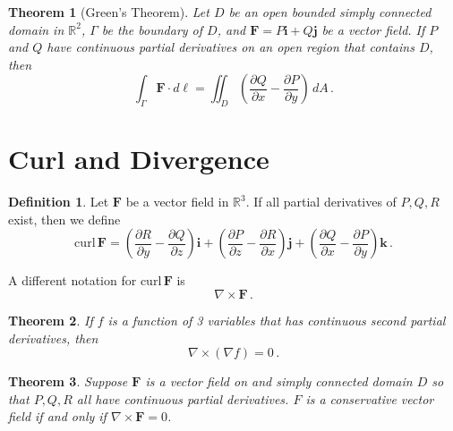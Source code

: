 \documentclass[
]{book}
\newtheorem{theorem}{Theorem}[chapter]
\theoremstyle{definition}
\newtheorem{definition}{Definition}[chapter]
\theoremstyle{definition}
\theoremstyle{definition}
\theoremstyle{definition}
\theoremstyle{remark}
\begin{document}
\begin{theorem}[Green's Theorem]
Let \(D\) be an open bounded simply connected domain in \(\mathbb{R}^2\),
\(\Gamma\) be the boundary of \(D\),
and \(\mathbf{F} = P\mathbf{i} + Q \mathbf{j}\) be a vector field.
If \(P\) and \(Q\) have continuous partial derivatives on an open region
that contains \(D\), then
\begin{equation*}
    \int_\Gamma \mathbf{F} \cdot d \ell  = \iint_D \left( \frac{\partial Q}{\partial x} - \frac{\partial P}{\partial y} \right) \, dA \,.
\end{equation*}
\end{theorem}

\hypertarget{curl-and-divergence}{%
\section{Curl and Divergence}\label{curl-and-divergence}}

\begin{definition}
Let \(\mathbf{F}\) be a vector field in \(\mathbb{R}^3\).
If all partial derivatives of \(P,Q,R\) exist, then we define
\begin{equation*}
    \mathrm{curl}\,\mathbf{F} =  \left( \frac{\partial R}{\partial y} - \frac{\partial Q}{\partial z} \right) \mathbf{i}
                       + \left( \frac{\partial P}{\partial z} - \frac{\partial R}{\partial x}  \right)  \mathbf{j}
                         + \left( \frac{\partial Q}{\partial x} - \frac{\partial P}{\partial y}  \right) \mathbf{k} \,.
\end{equation*}
\end{definition}

A different notation for \(\mathrm{curl} \, \mathbf{F}\) is
\begin{equation*}
    \nabla \times \mathbf{F} \,.
\end{equation*}

\begin{theorem}
If \(f\) is a function of 3 variables that has continuous second partial derivatives, then
\begin{equation*}
    \nabla \times ( \nabla f) = 0 \,.
\end{equation*}
\end{theorem}

\begin{theorem}
Suppose \(\mathbf{F}\) is a vector field on and simply connected domain \(D\) so that \(P,Q,R\)
all have continuous partial derivatives.
\(F\) is a conservative vector field if and only if
\(\nabla \times \mathbf{F} = 0\).
\end{theorem}
\end{document}
